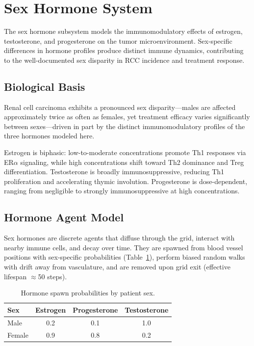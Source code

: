 \section{Sex Hormone System}
\label{sec:sex-hormone-system}

The sex hormone subsystem models the immunomodulatory effects of estrogen, testosterone, and progesterone on the tumor microenvironment. Sex-specific differences in hormone profiles produce distinct immune dynamics, contributing to the well-documented sex disparity in RCC incidence and treatment response.

\subsection{Biological Basis}
\label{sec:hormone-bio}

Renal cell carcinoma exhibits a pronounced sex disparity---males are affected approximately twice as often as females, yet treatment efficacy varies significantly between sexes---driven in part by the distinct immunomodulatory profiles of the three hormones modeled here.

Estrogen is biphasic: low-to-moderate concentrations promote Th1 responses via ER$\alpha$ signaling, while high concentrations shift toward Th2 dominance and Treg differentiation.  Testosterone is broadly immunosuppressive, reducing Th1 proliferation and accelerating thymic involution.  Progesterone is dose-dependent, ranging from negligible to strongly immunosuppressive at high concentrations.

\FloatBarrier
\subsection{Hormone Agent Model}
\label{sec:hormone-agent}

Sex hormones are discrete agents that diffuse through the grid, interact with nearby immune cells, and decay over time. They are spawned from blood vessel positions with sex-specific probabilities (Table~\ref{tab:hormone-spawn}), perform biased random walks with drift away from vasculature, and are removed upon grid exit (effective lifespan $\approx$50 steps).

\begin{table}[H]
\centering
\caption{Hormone spawn probabilities by patient sex.}
\label{tab:hormone-spawn}
\begin{tabular}{lccc}
\toprule
\textbf{Sex} & \textbf{Estrogen} & \textbf{Progesterone} & \textbf{Testosterone} \\
\midrule
Male   & 0.2 & 0.1 & 1.0 \\
Female & 0.9 & 0.8 & 0.2 \\
\bottomrule
\end{tabular}
\end{table}

